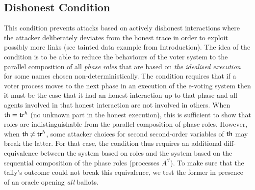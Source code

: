 \subsection{Dishonest Condition}
\label{sec:condi:dishonest}
This condition prevents attacks based on actively dishonest interactions where
the attacker deliberately deviates from the honest trace in order to exploit possibly
more links (\eg see tainted data example from Introduction).
The idea of the condition is to be able to reduce the behaviours of the voter
system to the parallel composition of all {\em phase roles} that are based on
{\em the idealised execution} for some names chosen non-deterministically.
The condition requires that if a voter process moves to the next phase in an execution of the e-voting system
then it must be the case
that it had an honest interaction up to that phase and all agents involved in that honest
interaction are not involved in others.
When $\mathsf{th}=\mathsf{tr}^h$ (no unknown part in the honest execution), this is sufficient to show that
roles are indistinguishable from the parallel composition of phase roles. However, when
$\mathsf{th}\neq\mathsf{tr}^h$, some attacker choices for second second-order variables of $\mathsf{th}$ may break the latter.
For that case, the condition thus requires an additional diff-equivalence between the system based on roles
and the system based on the sequential composition of the phase roles (\ie processes $A^{\forall}$).
To make sure that the tally's outcome
could not break this equivalence, we test the former in presence of an oracle
opening {\em all} ballots.

